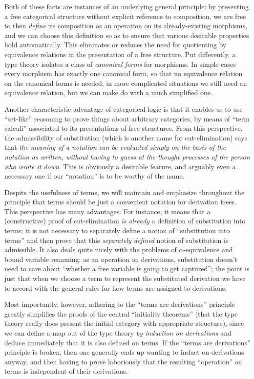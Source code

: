 Both of these facts are instances of an underlying general principle: by presenting a free categorical structure without explicit reference to composition, we are free to then \emph{define} its composition as an operation on its already-existing morphisms, and we can choose this definition so as to ensure that various desirable properties hold automatically.
This eliminates or reduces the need for quotienting by equivalence relations in the presentation of a free structure.
Put differently, a type theory isolates a class of \emph{canonical forms} for morphisms.
In simple cases every morphism has exactly one canonical form, so that no equivalence relation on the canonical forms is needed; in more complicated situations we still need an equivalence relation, but we can make do with a much simplified one.

Another characteristic advantage of categorical logic is that it enables us to use ``set-like'' reasoning to prove things about arbitrary categories, by means of ``term calculi'' associated to its presentations of free structures.
From this perspective, the admissibility of substitution (which is another name for cut-elimination) says that \emph{the meaning of a notation can be evaluated simply on the basis of the notation as written, without having to guess at the thought processes of the person who wrote it down}.
This is obviously a desirable feature, and arguably even a necessary one if our ``notation'' is to be worthy of the name.

Despite the usefulness of terms, we will maintain and emphasize throughout the principle that terms should be just a convenient notation for derivation trees.
This perspective has many advantages.
For instance, it means that a (constructive) proof of cut-elimination \emph{is already} a definition of substitution into terms; it is not necessary to separately define a notion of ``substitution into terms'' and then prove that this \emph{separately defined} notion of substitution is admissible.
It also deals quite nicely with the problems of $\alpha$-equivalence and bound variable renaming: as an operation on derivations, substitution doesn't need to care about ``whether a free variable is going to get captured''; the point is just that when we choose a term to represent the substituted derivation we have to accord with the general rules for how terms are assigned to derivations.

Most importantly, however, adhering to the ``terms are derivations'' principle greatly simplifies the proofs of the central ``initiality theorems'' (that the type theory really does present the initial category with appropriate structure), since we can define a map out of the type theory \emph{by induction on derivations} and deduce immediately that it is also defined on terms.
If the ``terms are derivations'' principle is broken, then one generally ends up wanting to induct on derivations anyway, and then having to prove laboriously that the resulting ``operation'' on terms is independent of their derivations.

